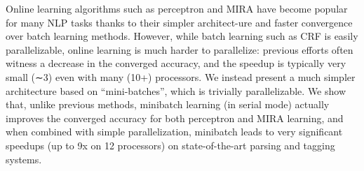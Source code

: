 Online learning algorithms such as perceptron and MIRA have become popular for many NLP tasks thanks to their simpler architect-ure and faster convergence
 over batch learning methods. However, while batch learning such as CRF is
 easily parallelizable, online learning is much harder to parallelize: previous
 efforts often witness a decrease in the converged accuracy, and the speedup is
 typically very small (∼3) even with many (10+) processors. We instead present
 a much simpler architecture based on ``mini-batches'', which is trivially
 parallelizable. We show that, unlike previous methods, minibatch learning (in
 serial mode) actually improves the converged accuracy for both perceptron and
 MIRA learning, and when combined with simple parallelization, minibatch leads
 to very significant speedups (up to 9x on 12 processors) on state-of-the-art
 parsing and tagging systems.

